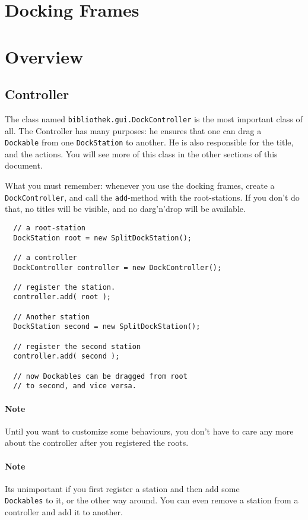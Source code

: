 \documentclass{article}
\begin{document}
\section{Docking Frames}

\section{Overview}
\subsection{Controller}
The class named \verb|bibliothek.gui.DockController| is the most important class of all. The Controller has many purposes: he ensures that one can drag a \\\verb!Dockable! from one \verb!DockStation! to another. He is also responsible for the title, and the actions. You will see more of this class in the other sections of this document.

What you must remember: whenever you use the docking frames, create a \verb!DockController!, and call the \verb!add!-method with the root-stations. If you don't do that, no titles will be visible, and no darg'n'drop will be available.

\begin{lstlisting}
  // a root-station
  DockStation root = new SplitDockStation();
  
  // a controller
  DockController controller = new DockController();
  
  // register the station.
  controller.add( root );
  
  // Another station
  DockStation second = new SplitDockStation();
  
  // register the second station
  controller.add( second );
  
  // now Dockables can be dragged from root
  // to second, and vice versa.
\end{lstlisting}

\paragraph{Note} Until you want to customize some behaviours, you don't have to care any more about the controller after you registered the roots.
\paragraph{Note} Its unimportant if you first register a station and then add some \\\verb!Dockables! to it, or the other way around. You can even remove a station from a controller and add it to another.
\end{document}
